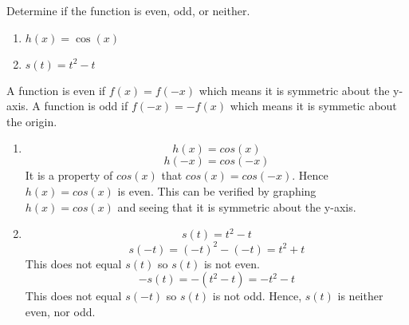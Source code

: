 \documentclass[noinstructornotes]{ximera}
\begin{document}
\begin{problem}
Determine if the function is even, odd, or neither.


\begin{enumerate}	
	\item  $h(x)=\cos(x)$
	
	\item  $s(t)=t^2-t$

	
	\end{enumerate}
	
	\begin{freeResponse}

		A function is even if $f(x)=f(-x)$ which means it is symmetric about the y-axis.  A function is odd if $f(-x)=-f(x)$ which means it is symmetic about the origin. 
		\begin{enumerate}
		
		\item $$h(x)=cos(x)$$
			$$h(-x)=cos(-x)$$
			It is a property of $cos(x)$ that $cos(x)=cos(-x)$.  Hence $h(x)=cos(x)$ is even.  This can be verified by graphing $h(x)=cos(x)$ and seeing that it is symmetric about the y-axis.
		
		\item  $$s(t)=t^2-t$$
			$$s(-t)=(-t)^2-(-t)=t^2+t$$ This does not equal $s(t)$ so $s(t)$ is not even.
			$$-s(t)=-(t^2-t)=-t^2-t$$  This does not equal $s(-t)$ so $s(t)$ is not odd.  Hence, $s(t)$ is neither even, nor odd.
		
		\end{enumerate}
	\end{freeResponse}
	
\end{problem}

\begin{instructorNotes}

\end{instructorNotes}
\end{document}

